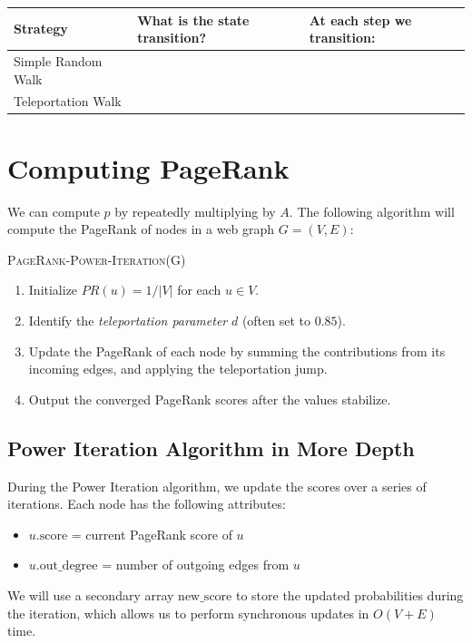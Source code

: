 \documentclass[11pt]{exam}
\begin{document}
\begin{tabular}{| l | p{7cm} | p{6cm} |}
    \hline
    \textbf{Strategy} & \textbf{What is the state transition?} & At each step we transition: \\
    \hline
    Simple Random Walk &  \phantom{Follow a random outgoing edge uniformly} & \phantom{along edges according to transition probabilities} \phantom{more of the same stuff right here} \\
    \hline
    Teleportation Walk & & \phantom{by following an edge or jumping to a random node} \phantom{more of the same stuff right here}\\
    \hline
\end{tabular}

\begin{center}
\end{center}

\vs{1cm}

\begin{center}
\end{center}

\newpage
\section{Computing PageRank}
We can compute $p$ by repeatedly multiplying by $A$. The following algorithm will compute the PageRank of nodes in a web graph $G = (V,E)$:
 
\textsc{PageRank-Power-Iteration}(G)
\begin{enumerate}
    \item Initialize $PR(u) = 1/|V|$ for each $u \in V$.
    \item Identify the \emph{teleportation parameter} $d$ (often set to $0.85$).
    \item Update the PageRank of each node by summing the contributions from its incoming edges, and applying the teleportation jump.
    \item Output the converged PageRank scores after the values stabilize. 
\end{enumerate}

\subsection{Power Iteration Algorithm in More Depth}
During the Power Iteration algorithm, we update the scores over a series of iterations. Each node has the following attributes:
\begin{itemize}
    \item $u.\text{score}$ = current PageRank score of $u$
    \item $u.\text{out\_degree}$ = number of outgoing edges from $u$
\end{itemize}
We will use a secondary array $\text{new\_score}$ to store the updated probabilities during the iteration, which allows us to perform synchronous updates in $O(V + E)$ time. 
\end{document}
